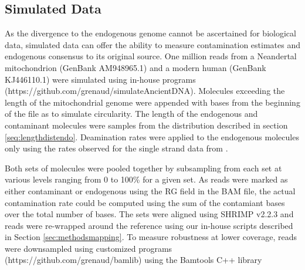\documentclass[a4paper,12pt]{article}
\begin{document}




\subsection{Simulated Data}
\label{sec:meth:simulated}

As the divergence to the endogenous genome cannot be ascertained for biological data, simulated data can offer the ability to measure contamination estimates and endogenous consensus to its original source. One million reads from a Neandertal mitochondrion (GenBank AM948965.1) and a modern human (GenBank KJ446110.1) were simulated using in-house programs (https://github.com/grenaud/simulateAncientDNA). Molecules exceeding the length of the mitochondrial genome were appended with bases from the beginning of the file as to simulate circularity. The length of the endogenous and contaminant molecules were samples from the distribution described in section \ref{seq:lengthdistendo}. Deamination rates were applied to the endogenous molecules only using the rates observed for the single strand data from \cite{lazaridis2014ancient}. %

Both sets of molecules were pooled together by subsampling from each set at various levels ranging from 0 to 100\% for a given set. As reads were marked as either contaminant or endogenous using the RG field in the BAM file, the actual contamination rate could be computed using the sum of the contamiant bases over the total number of bases. The sets were aligned using SHRIMP v2.2.3 and reads were re-wrapped around the reference using our in-house scripts described in Section \ref{sec:methodsmapping}. To measure robustness at lower coverage, reads were downsampled using customized programs (https://github.com/grenaud/bamlib) using the Bamtools C++ library \cite{barnett2011bamtools} 
\end{document}
